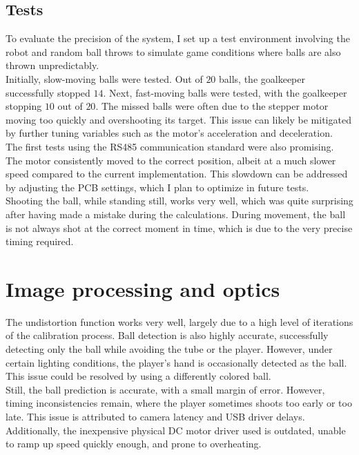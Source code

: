 \subsection{Tests}\label{subsec:tests}
To evaluate the precision of the system, I set up a test environment involving the robot and random ball throws to simulate game conditions where balls are also thrown unpredictably.\\
Initially, slow-moving balls were tested.
Out of $20$ balls, the goalkeeper successfully stopped $14$.
Next, fast-moving balls were tested, with the goalkeeper stopping $10$ out of $20$.
The missed balls were often due to the stepper motor moving too quickly and overshooting its target.
This issue can likely be mitigated by further tuning variables such as the motor's acceleration and deceleration.\\
The first tests using the RS485 communication standard were also promising.
The motor consistently moved to the correct position, albeit at a much slower speed compared to the current implementation.
This slowdown can be addressed by adjusting the PCB settings, which I plan to optimize in future tests.\\
Shooting the ball, while standing still, works very well, which was quite surprising after having made a mistake during the calculations.
During movement, the ball is not always shot at the correct moment in time, which is due to the very precise timing required.

\section{Image processing and optics}\label{sec:results_image}
The undistortion function works very well, largely due to a high level of iterations of the calibration process.
Ball detection is also highly accurate, successfully detecting only the ball while avoiding the tube or the player.
However, under certain lighting conditions, the player’s hand is occasionally detected as the ball.
This issue could be resolved by using a differently colored ball.\\
Still, the ball prediction is accurate, with a small margin of error.
However, timing inconsistencies remain, where the player sometimes shoots too early or too late.
This issue is attributed to camera latency and USB driver delays.
Additionally, the inexpensive physical DC motor driver used is outdated, unable to ramp up speed quickly enough, and prone to overheating.


